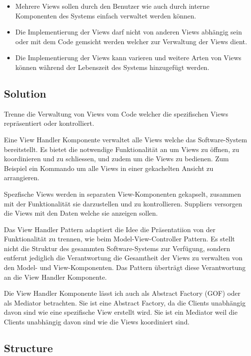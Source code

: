 \begin{itemize}
	\item Mehrere Views sollen durch den Benutzer wie auch durch interne Komponenten des Systems einfach verwaltet werden können.
	\item Die Implementierung der Views darf nicht von anderen Views abhängig sein oder mit dem Code gemsicht werden welcher zur Verwaltung der Views dient.
	\item Die Implementierung der Views kann varieren und weitere Arten von Views können während der Lebenszeit des Systems hinzugefügt werden.
\end{itemize}

\subsection*{Solution}


Trenne die Verwaltung von Views vom Code welcher die spezifischen Views repräsentiert oder kontrolliert.

Eine View Handler Komponente verwaltet alle Views welche das Software-System bereitstellt. Es bietet die notwendige Funktionalität an um Views zu öffnen, zu koordinieren und zu schliessen, und zudem um die Views zu bedienen. Zum Beispiel ein Kommando um alle Views in einer gekachelten Ansicht zu arrangieren.

Spezfische Views werden in separaten View-Komponenten gekapselt, zusammen mit der Funktionalität sie darzustellen und zu kontrollieren. Suppliers versorgen die Views mit den Daten welche sie anzeigen sollen.

Das View Handler Pattern adaptiert die Idee die Präsentatiion von der Funktionalität zu trennen, wie beim Model-View-Controller Pattern. Es stellt nicht die Struktur des gesammten Software-Systems zur Verfügung, sondern entfernt jediglich die Verantwortung die Gesamtheit der Views zu verwalten von den Model- und View-Komponenten. Das Pattern überträgt diese Verantwortung an die View Handler Komponente.

Die View Handler Komponente lässt ich auch als Abstract Factory (GOF) oder als Mediator betrachten. Sie ist eine Abstract Factory, da die Clients unabhängig davon sind wie eine spezifische View erstellt wird. Sie ist ein Mediator weil die Clients unabhängig davon sind wie die Views koordiniert sind.

\subsection*{Structure}

